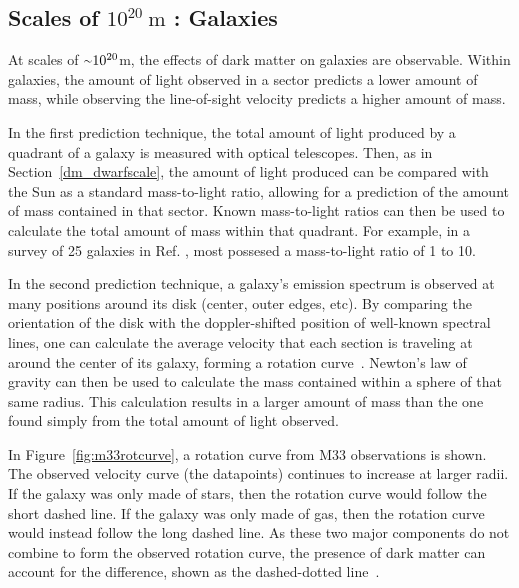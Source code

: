     \FloatBarrier

  \subsection{Scales of $10^{20}\:\text{m}$ : Galaxies}\label{dm_gal}
    At scales of $\nicetilde 10^{20}$m, the effects of dark matter on galaxies are observable.
    Within galaxies, the amount of light observed in a sector predicts a lower amount of mass, while observing the line-of-sight velocity predicts a higher amount of mass.
    
    In the first prediction technique, the total amount of light produced by a quadrant of a galaxy is measured with optical telescopes.
    Then, as in Section~\ref{dm_dwarfscale}, the amount of light produced can be compared with the Sun as a standard mass-to-light ratio, allowing for a prediction of the amount of mass contained in that sector.
    Known mass-to-light ratios can then be used to calculate the total amount of mass within that quadrant.
    For example, in a survey of 25 galaxies in Ref. \cite{galaxy_mass_light_ratio}, most possesed a mass-to-light ratio of 1 to 10.

    In the second prediction technique, a galaxy's emission spectrum is observed at many positions around its disk (center, outer edges, etc).
    By comparing the orientation of the disk with the doppler-shifted position of well-known spectral lines, one can calculate the average velocity that each section is traveling at around the center of its galaxy, forming a rotation curve~\cite{rotation_curve_review, spiral_galaxy_rot_curve, milkyway_dm_evidence}.
    Newton's law of gravity can then be used to calculate the mass contained within a sphere of that same radius.
    This calculation results in a larger amount of mass than the one found simply from the total amount of light observed.
    
    In Figure~\ref{fig:m33rotcurve}, a rotation curve from M33 observations is shown.
    The observed velocity curve (the datapoints) continues to increase at larger radii.
    If the galaxy was only made of stars, then the rotation curve would follow the short dashed line.
    If the galaxy was only made of gas, then the rotation curve would instead follow the long dashed line.
    As these two major components do not combine to form the observed rotation curve, the presence of dark matter can account for the difference, shown as the dashed-dotted line~\cite{m33rotcurve}.
    

